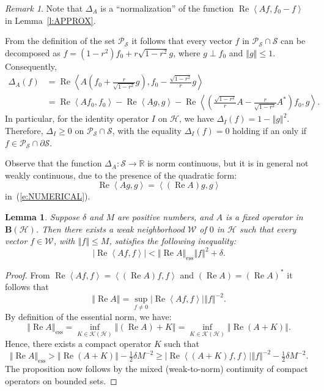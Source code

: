 \documentclass{tran-l}
\newtheorem{lem}[thm]{Lemma}
\theoremstyle{definition}
\theoremstyle{remark}
\newtheorem{rem}[thm]{Remark}
\numberwithin{equation}{subsection}
\DeclareMathOperator{\RE}{Re}
\DeclareMathOperator{\ess}{ess}
\newcommand{\To}{\longrightarrow}
\newcommand{\h}{\mathcal{H}}
\newcommand{\s}{\mathcal{S}}
\newcommand{\W}{\mathcal{W}}
\newcommand{\BH}{\mathbf{B}(\mathcal{H})}
\newcommand{\KH}{\mathcal{K}(\mathcal{H})}
\newcommand{\Real}{\mathbb{R}}
\newcommand{\Polar}{\mathcal{P}_{\s}}
\newcommand{\abs}[1]{\left\vert#1\right\vert}
\newcommand{\seq}[1]{\left<#1\right>}
\newcommand{\norm}[1]{\left\Vert#1\right\Vert}
\newcommand{\essnorm}[1]{\norm{#1}_{\ess}}
\begin{document}
\begin{rem}
Note that $\Delta_A$ is a ``normalization'' of the function $\RE\seq{A{f},f_0-f}$ in Lemma~\ref{l:APPROX}.

From the definition of the set $\Polar$ it follows that every vector $f$ in $\Polar\cap\s$ can be decomposed as $f=(1-r^2)f_0 + r\sqrt{1-r^2} g$, where $g \perp f_0$ and $\norm{g}\leq 1$. Consequently,
\begin{equation}\label{e:NUMERICAL}
  \begin{split}
    \Delta_A(f) &=
    \RE\seq{A\left(f_0+\tfrac{r}{\sqrt{1-r^2}}g\right),
       f_0-\tfrac{\sqrt{1-r^2}}{r}g}\\ &=
    \RE\seq{A f_0, f_0} - \RE\seq{Ag, g} -
      \RE\seq{\left(\tfrac{\sqrt{1-r^2}}{r}A
      -\tfrac{r}{\sqrt{1-r^2}}A^*\right) f_0, g}.
  \end{split}
\end{equation}
In particular, for the identity operator $I$ on $\h$, we have $\Delta_I(f)=1-\norm{g}^2$. Therefore, $\Delta_I\geq0$ on $\Polar\cap\s$, with the equality $\Delta_I(f)=0$ holding if an only if $f\in\Polar\cap\partial\s$.

Observe that the function $\Delta_A\colon\s\To\Real$ is norm continuous, but it is in general not weakly continuous, due to the presence of the quadratic form:
\[ \RE\seq{A g,g} = \seq{(\RE{A})g,g} \]
in~(\ref{e:NUMERICAL}).
\end{rem}

\begin{lem} \label{l:EssNR}
Suppose $\delta$ and $M$ are positive numbers, and $A$ is a fixed operator in $\BH$. Then there exists a weak neighborhood $\W$ of $0$ in $\h$ such that every vector $f\in\W$, with $\norm{f}\leq{M}$, satisfies the following inequality:
\[ \abs{\RE\seq{A{f},f}} < \essnorm{\RE{A}}\norm{f}^2 + \delta. \]
\end{lem}

\begin{proof}
From $\RE\seq{A f,f}=\seq{(\RE{A})f,f}$ and $(\RE{A})=(\RE{A})^*$ it follows that
\[ \norm{\RE{A}} = \sup_{f\neq0}
   \abs{\RE\seq{A f,f}}\norm{f}^{-2}. \]
By definition of the essential norm, we have:
\[ \essnorm{\RE A} = \inf_{K\in\KH} \norm{(\RE A)+K} =
   \inf_{K\in\KH} \norm{\RE(A+K)}. \]
Hence, there exists a compact operator $K$ such that
\[ \essnorm{\RE A} > \norm{\RE(A+K)}    - \tfrac{1}{2}\delta M^{-2} \geq
   \abs{\RE\seq{(A+K)f,f}}\norm{f}^{-2} - \tfrac{1}{2}\delta M^{-2} . \]
The proposition now follows by the mixed (weak-to-norm) continuity of compact operators on bounded sets.
\end{proof}
\end{document}
